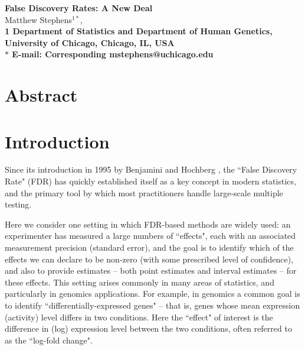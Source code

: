 \documentclass[11pt]{article}
\date{}
\begin{document}
\begin{flushleft}
{\Large
\textbf{False Discovery Rates: A New Deal}
}
\\
Matthew Stephens$^{1*}$, 
\\
\bf{1} Department of Statistics and Department of Human Genetics, University of Chicago, Chicago, IL, USA
\\
$\ast$ E-mail: Corresponding mstephens@uchicago.edu
\end{flushleft}

\section*{Abstract}


\section*{Introduction}

Since its introduction in 1995 by Benjamini and Hochberg 
\cite{benjamini1995controlling}, the ``False Discovery Rate" (FDR) has quickly established itself
as a key concept in modern statistics, and the primary tool by which most practitioners handle large-scale multiple testing.

Here we consider one setting in which FDR-based methods are widely used:
an experimenter has measured a large numbers of ``effects", each with an associated
measurement precision (standard error), 
and the goal is to identify which of the effects we can declare to be non-zero (with some prescribed level of confidence), and also
to provide estimates -- both point estimates and interval estimates -- for these effects.
This setting arises commonly in many areas of statistics, and particularly in genomics applications.
For example, in genomics
a common goal is to identify ``differentially-expressed genes" -- that is, genes
whose mean expression (activity) level differs in two conditions. Here the ``effect" of interest is the difference in (log) 
expression level between the two conditions, often referred to as the ``log-fold change". 
\end{document}
